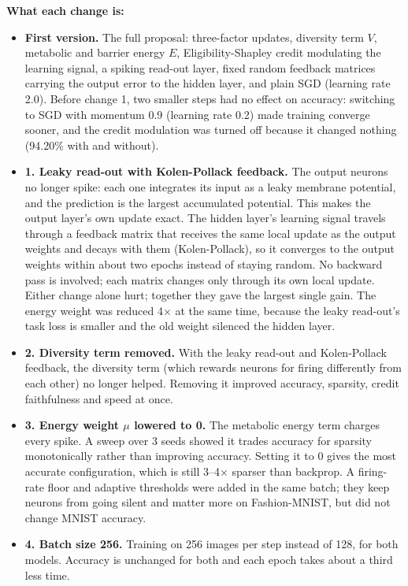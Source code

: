 \documentclass{article}
\begin{document}
{\small
\noindent\textbf{What each change is:}
\begin{itemize}
  \item \textbf{First version.} The full proposal: three-factor updates, diversity term $V$, metabolic and barrier energy $E$, Eligibility-Shapley credit modulating the learning signal, a spiking read-out layer, fixed random feedback matrices carrying the output error to the hidden layer, and plain SGD (learning rate 2.0). Before change 1, two smaller steps had no effect on accuracy: switching to SGD with momentum 0.9 (learning rate 0.2) made training converge sooner, and the credit modulation was turned off because it changed nothing (94.20\% with and without).
  \item \textbf{1. Leaky read-out with Kolen-Pollack feedback.} The output neurons no longer spike: each one integrates its input as a leaky membrane potential, and the prediction is the largest accumulated potential. This makes the output layer's own update exact. The hidden layer's learning signal travels through a feedback matrix that receives the same local update as the output weights and decays with them (Kolen-Pollack), so it converges to the output weights within about two epochs instead of staying random. No backward pass is involved; each matrix changes only through its own local update. Either change alone hurt; together they gave the largest single gain. The energy weight was reduced 4$\times$ at the same time, because the leaky read-out's task loss is smaller and the old weight silenced the hidden layer.
  \item \textbf{2. Diversity term removed.} With the leaky read-out and Kolen-Pollack feedback, the diversity term (which rewards neurons for firing differently from each other) no longer helped. Removing it improved accuracy, sparsity, credit faithfulness and speed at once.
  \item \textbf{3. Energy weight $\mu$ lowered to 0.} The metabolic energy term charges every spike. A sweep over 3 seeds showed it trades accuracy for sparsity monotonically rather than improving accuracy. Setting it to 0 gives the most accurate configuration, which is still 3--4$\times$ sparser than backprop. A firing-rate floor and adaptive thresholds were added in the same batch; they keep neurons from going silent and matter more on Fashion-MNIST, but did not change MNIST accuracy.
  \item \textbf{4. Batch size 256.} Training on 256 images per step instead of 128, for both models. Accuracy is unchanged for both and each epoch takes about a third less time.

\end{itemize}}
\end{document}
